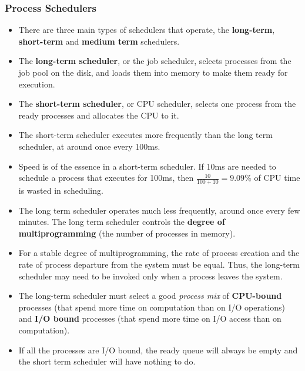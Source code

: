 \documentclass{article}
\theoremstyle{plain}
\theoremstyle{definition}
\begin{document}
\subsubsection{Process Schedulers}
\begin{itemize}
    \item There are three main types of schedulers that operate, the \textbf{long-term}, \textbf{short-term} and \textbf{medium term} schedulers.
    
    \item The \textbf{long-term scheduler}, or the job scheduler, selects processes from the job pool on the disk, and loads them into memory to make them ready for execution.
    
    \item The \textbf{short-term scheduler}, or CPU scheduler, selects one process from the ready processes and allocates the CPU to it.
    
    \item The short-term scheduler executes more frequently than the long term scheduler, at around once every 100ms. 
    
    \item Speed is of the essence in a short-term scheduler. If 10ms are needed to schedule a process that executes for 100ms, then $\frac{10}{100+10} = 9.09\%$ of CPU time is wasted in scheduling. 
    
    \item The long term scheduler operates much less frequently, around once every few minutes. The long term scheduler controls the \textbf{degree of multiprogramming} (the number of processes in memory). 
    
    \item For a stable degree of multiprogramming, the rate of process creation and the rate of process departure from the system must be equal. Thus, the long-term scheduler may need to be invoked only when a process leaves the system.
    
    \item The long-term scheduler must select a good \textit{process mix} of \textbf{CPU-bound} processes (that spend more time on computation than on I/O operations) and \textbf{I/O bound} processes (that spend more time on I/O access than on computation). 
    
    \item If all the processes are I/O bound, the ready queue will always be empty and the short term scheduler will have nothing to do.
    

\end{itemize}
\end{document}

